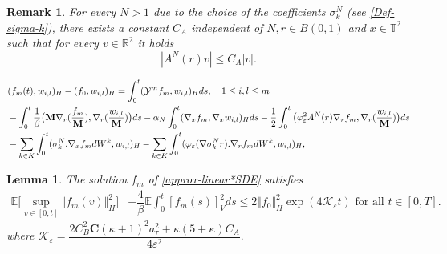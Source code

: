 \documentclass[10pt,a4paper]{amsart}
\newtheorem{remark}{Remark}
\newtheorem{lemma}{Lemma}
\newcommand{\E}{\ensuremath{\mathbb{E}}}
\newcommand{\R}{\mathbb{R}}
\newcommand{\T}{\mathbb{T}}
\begin{document}
      \begin{remark}\label{rmq-bound_A^N}
            For every $N>1$ due to the choice of the coefficients $\sigma_k^N$ (see \eqref{Def-sigma-k}), there exists a constant $C_A$ independent of $N, r\in B(0, 1)$ and $x\in \T^2$ such that for every $v\in \R^2$ it holds
            $$|A^N(r)v| \le C_A|v|.$$
              \end{remark}

\begin{align}\label{approx-linear*SDE}
    &(f_m(t),w_{i,l})_H-(f_{0},w_{i,l})_H=\int_0^t(\mathcal{Y}^mf_m,w_{i,l})_Hds, \quad 1\leq i,l \leq m \\
    &	-\int_0^t\dfrac{1}{\beta}\big(\mathbf{M}\nabla_r(\dfrac{f_m}{\mathbf{M}}),\nabla_r(\dfrac{w_{i,l}}{\mathbf{M}})\big)ds -\alpha_N\int_0^t(\nabla_x f_m,\nabla_x w_{i,l})_Hds- \dfrac{1}{2}\int_0^t\big(\varphi_\varepsilon^2A^N(r) \nabla_rf_m,\nabla_r(\dfrac{w_{i,l}}{\mathbf{M}})\big)ds\notag\\
            &-\sum_{k\in K}\int_0^t(\sigma_k^N.\nabla_xf_mdW^k,w_{i,l})_H -\sum_{k\in K}\int_0^t(\varphi_\varepsilon(\nabla \sigma_k^Nr).\nabla_rf_m dW^k,w_{i,l})_H, \notag
\end{align}

\begin{lemma}\label{sec:estimates}
The solution $f_m$ of \eqref{approx-linear*SDE} satisfies
    \begin{align}\label{key-est-Galerkin}
 \E\Big[\sup_{v\in[0,t]} \Vert f_m(v)\Vert_H^2  \Big]&+\dfrac{4}{\beta}\E\int_0^t [f_m(s)]_V^2ds\leq 2\Vert f_{0}\Vert_H^2\exp{(4\mathcal{K}_\varepsilon t)} \text{ for all } t\in [0,T].
\end{align}
where $\mathcal{K}_\varepsilon=\dfrac{2C_B^2\mathbf{C}(\kappa+1)^2 a_\tau^2+\kappa (5+\kappa)C_A}{4\varepsilon^2}.$
\end{lemma}
\end{document}
